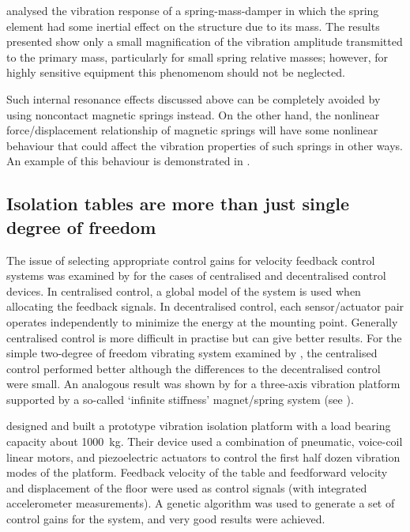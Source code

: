 \textcite{wu2006} analysed the vibration response of a spring-mass-damper in
which the spring element had some inertial effect on the structure due to its
mass. The results presented show only a small magnification of the vibration
amplitude transmitted to the primary mass, particularly for small spring
relative masses; however, for highly sensitive equipment this phenomenom
should not be neglected.

Such internal resonance effects discussed above can be completely avoided by
using noncontact magnetic springs instead. On the other hand, the nonlinear
force/displacement relationship of magnetic springs will have some nonlinear
behaviour that could affect the vibration properties of such springs in other
ways. An example of this behaviour is demonstrated in
.

\subsection{Isolation tables are more than just single degree of freedom}

The issue of selecting appropriate control gains for velocity feedback control
systems was examined by \textcite{engels2008} for the cases of centralised and
decentralised control devices. In centralised control, a global model of the
system is used when allocating the feedback signals. In decentralised control,
each sensor/actuator pair operates independently to minimize the energy at the
mounting point. Generally centralised control is more difficult in practise
but can give better results. For the simple two-degree of freedom vibrating
system examined by \textcite{engels2008}, the centralised control performed
better although the differences to the decentralised control were small. An
analogous result was shown by \textcite{hoque2006} for a three-axis vibration
platform supported by a so-called `infinite stiffness' magnet/spring system (see
).

\textcite{yoshioka2001} designed and built a prototype vibration
isolation platform with a load bearing capacity about
\SI{1000}{kg}. Their device used a combination of pneumatic,
voice-coil linear motors, and piezoelectric actuators to control the
first half dozen vibration modes of the platform. Feedback velocity of
the table and feedforward velocity and displacement of the floor were
used as control signals (with integrated accelerometer
measurements). A genetic algorithm was used to generate a set of
control gains for the system, and very good results were achieved.




